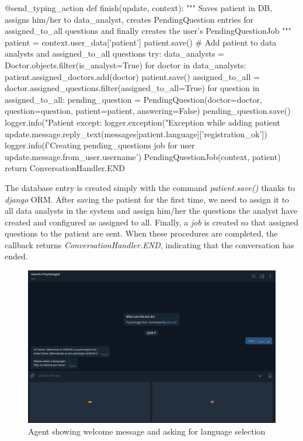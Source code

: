 \documentclass[12pt,english]{article}
\begin{document}
\begin{python}[caption={Patient saver callback}, captionpos=b]
  @send_typing_action
  def finish(update, context):
      """
      Saves patient in DB, assigns him/her to data_analyst, creates PendingQuestion entries for assigned_to_all questions and finally creates the user's PendingQuestionJob
      """
      patient = context.user_data['patient']
      patient.save()
      # Add patient to data analysts and assigned_to_all questions
      try:
          data_analysts = Doctor.objects.filter(is_analyst=True)
          for doctor in data_analysts:
              patient.assigned_doctors.add(doctor)
              patient.save()
              assigned_to_all = doctor.assigned_questions.filter(assigned_to_all=True)
              for question in assigned_to_all:
                  pending_question = PendingQuestion(doctor=doctor, question=question, patient=patient, answering=False)
                  pending_question.save()
          logger.info("Patient %
      except:
          logger.exception("Exception while adding patient %
      update.message.reply_text(messages[patient.language]['registration_ok'])
      logger.info(f'Creating pending_questions job for user {update.message.from_user.username}')
      PendingQuestionJob(context, patient)
      return ConversationHandler.END
\end{python}

The database entry is created simply with the command \emph{patient.save()} thanks to \emph{django} ORM. After saving the patient for the first time, we need to assign it to all data analysts in the system and assign him/her the questions the analyst have created and configured as assigned to all. Finally, a \emph{job} is created so that assigned questions to the patient are sent. When these procedures are completed, the callback returns \emph{ConversationHandler.END}, indicating that the conversation has ended.

\begin{figure}[H]
  \centering
  \includegraphics[width=\textwidth]{start.png}
  \caption{Agent showing welcome message and asking for language selection}
\end{figure}
\end{document}
